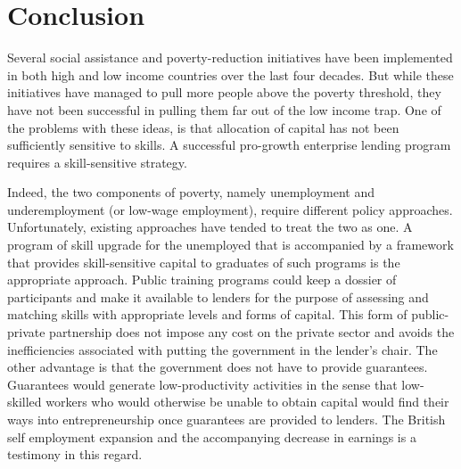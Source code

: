 \documentclass[
  a4paper,
  DIV=11,
  numbers=noendperiod]{scrartcl}
\begin{document}
\hypertarget{conclusion}{%
\section{Conclusion}\label{conclusion}}

Several social assistance and poverty-reduction initiatives have been
implemented in both high and low income countries over the last four
decades. But while these initiatives have managed to pull more people
above the poverty threshold, they have not been successful in pulling
them far out of the low income trap. One of the problems with these
ideas, is that allocation of capital has not been sufficiently sensitive
to skills. A successful pro-growth enterprise lending program requires a
skill-sensitive strategy.

Indeed, the two components of poverty, namely unemployment and
underemployment (or low-wage employment), require different policy
approaches. Unfortunately, existing approaches have tended to treat the
two as one. A program of skill upgrade for the unemployed that is
accompanied by a framework that provides skill-sensitive capital to
graduates of such programs is the appropriate approach. Public training
programs could keep a dossier of participants and make it available to
lenders for the purpose of assessing and matching skills with
appropriate levels and forms of capital. This form of public-private
partnership does not impose any cost on the private sector and avoids
the inefficiencies associated with putting the government in the
lender's chair. The other advantage is that the government does not have
to provide guarantees. Guarantees would generate low-productivity
activities in the sense that low-skilled workers who would otherwise be
unable to obtain capital would find their ways into entrepreneurship
once guarantees are provided to lenders. The British self employment
expansion and the accompanying decrease in earnings is a testimony in
this regard.
\end{document}
